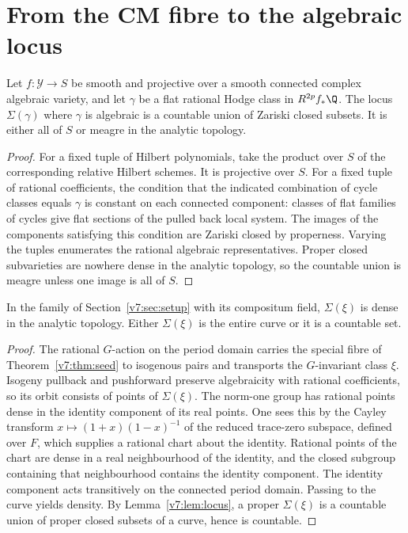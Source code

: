 \section{From the CM fibre to the algebraic locus}\label{v7:sec:locus}

\begin{lemma}\label{v7:lem:locus}
Let \(f:\mathcal Y\to S\) be smooth and projective over a smooth connected complex algebraic variety, and let \(\gamma\) be a flat rational Hodge class in \(R^{2p}f_*\Q\). The locus \(\Sigma(\gamma)\) where \(\gamma\) is algebraic is a countable union of Zariski closed subsets. It is either all of \(S\) or meagre in the analytic topology.
\end{lemma}
\begin{proof}
For a fixed tuple of Hilbert polynomials, take the product over \(S\) of the corresponding relative Hilbert schemes. It is projective over \(S\). For a fixed tuple of rational coefficients, the condition that the indicated combination of cycle classes equals \(\gamma\) is constant on each connected component: classes of flat families of cycles give flat sections of the pulled back local system. The images of the components satisfying this condition are Zariski closed by properness. Varying the tuples enumerates the rational algebraic representatives. Proper closed subvarieties are nowhere dense in the analytic topology, so the countable union is meagre unless one image is all of \(S\).
\end{proof}

\begin{corollary}\label{v7:cor:dense}
In the family of Section~\ref{v7:sec:setup} with its compositum field, \(\Sigma(\xi)\) is dense in the analytic topology. Either \(\Sigma(\xi)\) is the entire curve or it is a countable set.
\end{corollary}
\begin{proof}
The rational \(G\)-action on the period domain carries the special fibre of Theorem~\ref{v7:thm:seed} to isogenous pairs and transports the \(G\)-invariant class \(\xi\). Isogeny pullback and pushforward preserve algebraicity with rational coefficients, so its orbit consists of points of \(\Sigma(\xi)\). The norm-one group has rational points dense in the identity component of its real points. One sees this by the Cayley transform \(x\mapsto (1+x)(1-x)^{-1}\) of the reduced trace-zero subspace, defined over \(F\), which supplies a rational chart about the identity. Rational points of the chart are dense in a real neighbourhood of the identity, and the closed subgroup containing that neighbourhood contains the identity component. The identity component acts transitively on the connected period domain. Passing to the curve yields density. By Lemma~\ref{v7:lem:locus}, a proper \(\Sigma(\xi)\) is a countable union of proper closed subsets of a curve, hence is countable.
\end{proof}

